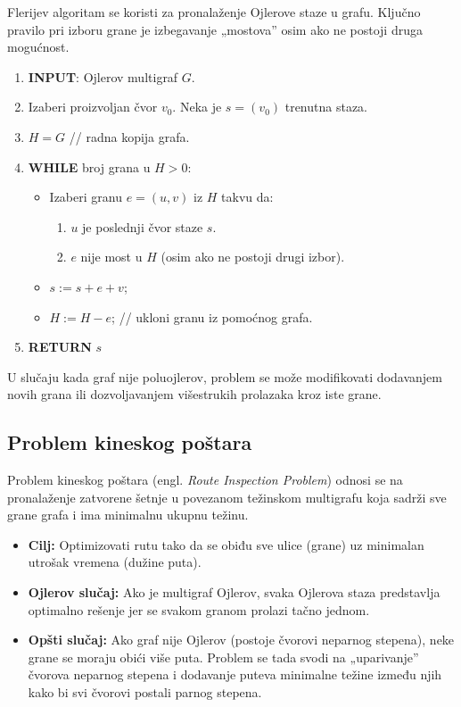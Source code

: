 \documentclass[a4paper,12pt]{article}
\numberwithin{algorithm}{section}
\theoremstyle{plain}
\theoremstyle{definition}
\theoremstyle{remark}
\begin{document}
Flerijev algoritam se koristi za pronalaženje Ojlerove staze u grafu. Ključno pravilo pri izboru grane je izbegavanje „mostova” osim ako ne postoji druga mogućnost.
\newpage
\begin{algorithm}[!h]
    \caption{Flerijev algoritam}
    \begin{enumerate}
        \item \textbf{INPUT}: Ojlerov multigraf $G$.
        \item Izaberi proizvoljan čvor $v_0$. Neka je $s = (v_0)$ trenutna staza.
        \item $H = G$ // radna kopija grafa.
        \item \textbf{WHILE} broj grana u $H > 0$:
        \begin{itemize}
            \item Izaberi granu $e = (u, v)$ iz $H$ takvu da:
            \begin{enumerate}
                \item $u$ je poslednji čvor staze $s$.
                \item $e$ nije most u $H$ (osim ako ne postoji drugi izbor).
            \end{enumerate}
            \item $s := s + e + v$; 
            \item $H := H - e$; // ukloni granu iz pomoćnog grafa.
        \end{itemize}
        \item \textbf{RETURN} $s$
    \end{enumerate}
\end{algorithm}



U slučaju kada graf nije poluojlerov, problem se može modifikovati dodavanjem novih grana ili dozvoljavanjem višestrukih prolazaka kroz iste grane.


\subsection{Problem kineskog poštara}
Problem kineskog poštara (engl. \textit{Route Inspection Problem}) odnosi se na pronalaženje zatvorene šetnje u povezanom težinskom multigrafu koja sadrži sve grane grafa i ima minimalnu ukupnu težinu.

\begin{itemize}
    \item \textbf{Cilj:} Optimizovati rutu tako da se obiđu sve ulice (grane) uz minimalan utrošak vremena (dužine puta).
    \item \textbf{Ojlerov slučaj:} Ako je multigraf Ojlerov, svaka Ojlerova staza predstavlja optimalno rešenje jer se svakom granom prolazi tačno jednom.
    \item \textbf{Opšti slučaj:} Ako graf nije Ojlerov (postoje čvorovi neparnog stepena), neke grane se moraju obići više puta. Problem se tada svodi na „uparivanje” čvorova neparnog stepena i dodavanje puteva minimalne težine između njih kako bi svi čvorovi postali parnog stepena.
\end{itemize}
\end{document}
